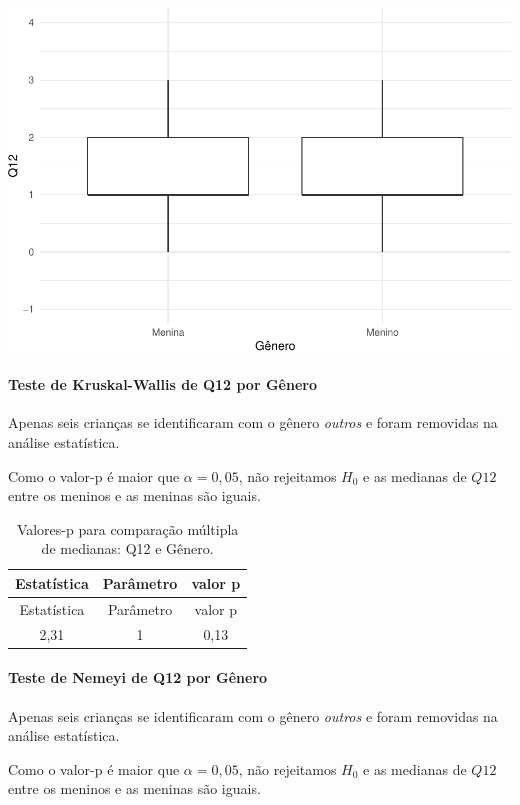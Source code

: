 \documentclass[]{article}
\let\oldparagraph\paragraph
\renewcommand{\paragraph}[1]{\oldparagraph{#1}\mbox{}}
\begin{document}
\begin{center}\includegraphics[width=0.75\linewidth]{relatorio_files/figure-latex/unnamed-chunk-28-1} \end{center}

\hypertarget{teste-de-kruskal-wallis-de-q12-por-guxeanero}{%
\paragraph{Teste de Kruskal-Wallis de Q12 por Gênero}\label{teste-de-kruskal-wallis-de-q12-por-guxeanero}}

Apenas seis crianças se identificaram com o gênero \emph{outros} e foram removidas na análise estatística.

Como o valor-p é maior que \(\alpha=0,05\), não rejeitamos \(H_0\) e as medianas de \(Q12\) entre os meninos e as meninas são iguais.

\begin{longtable}[]{@{}ccc@{}}
\caption{\label{tab:unnamed-chunk-29}Valores-p para comparação múltipla de medianas: Q12 e Gênero.}\tabularnewline
\toprule
Estatística & Parâmetro & valor p\tabularnewline
\midrule
\endfirsthead
\toprule
Estatística & Parâmetro & valor p\tabularnewline
\midrule
\endhead
2,31 & 1 & 0,13\tabularnewline
\bottomrule
\end{longtable}

\hypertarget{teste-de-nemeyi-de-q12-por-guxeanero}{%
\paragraph{Teste de Nemeyi de Q12 por Gênero}\label{teste-de-nemeyi-de-q12-por-guxeanero}}

Apenas seis crianças se identificaram com o gênero \emph{outros} e foram removidas na análise estatística.

Como o valor-p é maior que \(\alpha=0,05\), não rejeitamos \(H_0\) e as medianas de \(Q12\) entre os meninos e as meninas são iguais.
\end{document}

